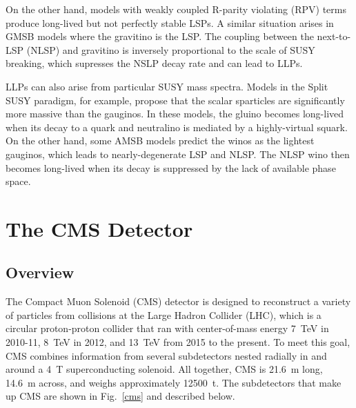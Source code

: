 \documentclass[12pt]{article}
\begin{document}
    On the other hand, models with weakly coupled R-parity violating (RPV) terms produce long-lived but not perfectly stable LSPs. A similar situation arises in GMSB models where the gravitino is the LSP. The coupling between the next-to-LSP (NLSP) and gravitino is inversely proportional to the scale of SUSY breaking, which supresses the NSLP decay rate and can lead to LLPs.


    LLPs can also arise from particular SUSY mass spectra. Models in the Split SUSY paradigm, for example, propose that the scalar sparticles are significantly more massive than the gauginos. In these models, the gluino becomes long-lived when its decay to a quark and neutralino is mediated by a highly-virtual squark.   On the other hand, some AMSB models predict the winos as the lightest gauginos, which leads to nearly-degenerate LSP and NLSP. The NLSP wino then becomes long-lived when its decay is suppressed by the lack of available phase space. 


\section{The CMS Detector}
    \subsection{Overview}
        The Compact Muon Solenoid (CMS) detector is designed to reconstruct a variety of particles from collisions at the Large Hadron Collider (LHC), which is a circular proton-proton collider that ran with center-of-mass energy \SI{7}{\tera\electronvolt} in 2010-11, \SI{8}{\tera\electronvolt} in 2012, and \SI{13}{\tera\electronvolt} from 2015 to the present. To meet this goal, CMS combines information from several subdetectors nested radially in and around a \SI{4}{\tesla} superconducting solenoid. All together, CMS is \SI{21.6}{\m} long, \SI{14.6}{\m} across, and weighs approximately \SI{12500}{t}. The subdetectors that make up CMS are shown in Fig.~\ref{cms} and described below.
\end{document}
